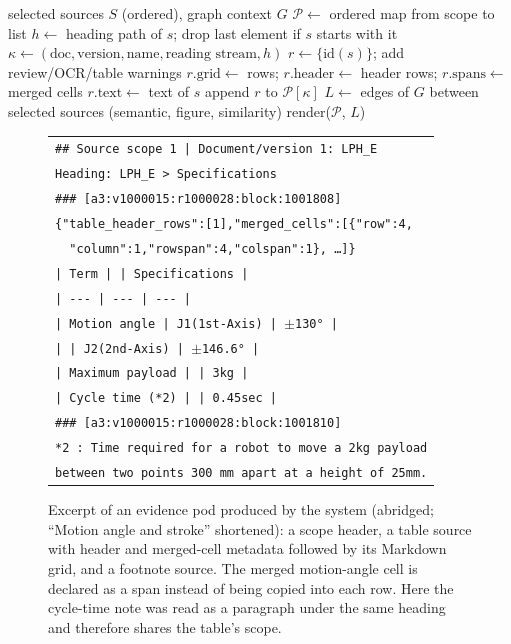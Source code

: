 \documentclass[runningheads]{llncs}
\begin{document}
\begin{algorithm}[t]
\caption{Evidence pod serialization}\label{alg:pods}
\begin{algorithmic}[1]
\Require selected sources $S$ (ordered), graph context $G$
\State $\mathcal{P}\gets$ ordered map from scope to list
  \State $h\gets$ heading path of $s$; drop last element if $s$ starts with it
  \State $\kappa\gets(\text{doc},\text{version},\text{name},\text{reading stream},h)$
  \State $r\gets\{\text{id}(s)\}$; add review/OCR/table warnings
    \State $r.\text{grid}\gets$ rows; $r.\text{header}\gets$ header rows; $r.\text{spans}\gets$ merged cells
  \Else \State $r.\text{text}\gets$ text of $s$ \EndIf
  \State append $r$ to $\mathcal{P}[\kappa]$
\EndFor
\State $L\gets$ edges of $G$ between selected sources (semantic, figure, similarity)
\State \Return render($\mathcal{P}$, $L$)
\end{algorithmic}
\end{algorithm}

\begin{figure}[!htbp]
\centering
\scriptsize
\begin{tabular}{@{}p{}@{}}
\toprule
\texttt{\#\# Source scope 1 | Document/version 1: LPH\_E}\\
\texttt{Heading: LPH\_E > Specifications}\\
\texttt{\#\#\# [a3:v1000015:r1000028:block:1001808]}\\
\texttt{\{"table\_header\_rows":[1],"merged\_cells":[\{"row":4,}\\
\texttt{\ \ "column":1,"rowspan":4,"colspan":1\}, \ldots]\}}\\
\texttt{| Term | | Specifications |}\\
\texttt{| -{}-{}- | -{}-{}- | -{}-{}- |}\\
\texttt{| Motion angle | J1(1st-Axis) | $\pm$130° |}\\
\texttt{| | J2(2nd-Axis) | $\pm$146.6° |}\\
\texttt{| Maximum payload | | 3kg |}\\
\texttt{| Cycle time (*2) | | 0.45sec |}\\
\texttt{\#\#\# [a3:v1000015:r1000028:block:1001810]}\\
\texttt{*2 : Time required for a robot to move a 2kg payload}\\
\texttt{between two points 300 mm apart at a height of 25mm.}\\
\bottomrule
\end{tabular}
\caption{Excerpt of an evidence pod produced by the system (abridged; ``Motion angle and stroke'' shortened): a scope header, a table source with header and merged-cell metadata followed by its Markdown grid, and a footnote source. The merged motion-angle cell is declared as a span instead of being copied into each row. Here the cycle-time note was read as a paragraph under the same heading and therefore shares the table's scope.}
\label{fig:pod}
\end{figure}
\end{document}
